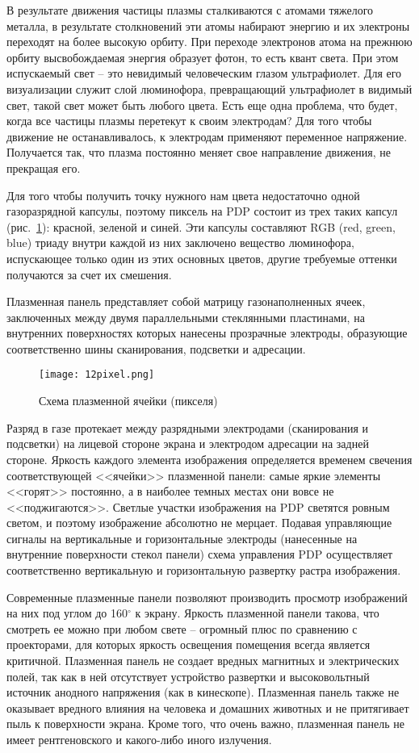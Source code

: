 В результате движения частицы плазмы сталкиваются с атомами тяжелого металла, в результате столкновений эти атомы набирают энергию и их электроны переходят на более высокую орбиту. При переходе электронов атома на прежнюю орбиту высвобождаемая энергия образует фотон, то есть квант света. При этом испускаемый свет – это невидимый человеческим глазом ультрафиолет. Для его визуализации служит слой люминофора, превращающий ультрафиолет в видимый свет, такой свет может быть любого цвета. Есть еще одна проблема, что будет, когда все частицы плазмы перетекут к своим электродам? Для того чтобы движение не останавливалось, к электродам применяют переменное напряжение. Получается так, что плазма постоянно меняет свое направление движения, не прекращая его. 

Для того чтобы получить точку нужного нам цвета недостаточно одной газоразрядной капсулы, поэтому пиксель на PDP состоит из трех таких капсул (рис.~\ref{pic:12pixel}): красной, зеленой и синей. Эти капсулы составляют RGB (red, green, blue) триаду внутри каждой из них заключено вещество люминофора, испускающее только один из этих основных цветов, другие требуемые оттенки получаются за счет их смешения. 

Плазменная панель представляет собой матрицу газонаполненных ячеек, заключенных между двумя параллельными стеклянными пластинами, на внутренних поверхностях которых нанесены прозрачные электроды, образующие соответственно шины сканирования, подсветки и адресации.

\begin{figure}[h!]
	\caption{ Схема плазменной ячейки (пикселя) }
	\texttt{[image: 12pixel.png]}
	\label{pic:12pixel}
\end{figure}

Разряд в газе протекает между разрядными электродами (сканирования и подсветки) на лицевой стороне экрана и электродом адресации на задней стороне. Яркость каждого элемента изображения определяется временем свечения соответствующей <<ячейки>> плазменной панели: самые яркие элементы <<горят>> постоянно, а в наиболее темных местах они вовсе не <<поджигаются>>. Светлые участки изображения на PDP светятся ровным светом, и поэтому изображение абсолютно не мерцает. Подавая управляющие сигналы на вертикальные и горизонтальные электроды (нанесенные на внутренние поверхности стекол панели) схема управления PDP осуществляет соответственно вертикальную и горизонтальную развертку растра изображения.

Современные плазменные панели позволяют производить просмотр изображений на них под углом до 160$ ^\circ $ к экрану. Яркость плазменной панели такова, что смотреть ее можно при любом свете – огромный плюс по сравнению с проекторами, для которых яркость освещения помещения всегда является критичной. Плазменная панель не создает вредных магнитных и электрических полей, так как в ней отсутствует устройство развертки и высоковольтный источник анодного напряжения (как в кинескопе). Плазменная панель также не оказывает вредного влияния на человека и домашних животных и не притягивает пыль к поверхности экрана. Кроме того, что очень важно, плазменная панель не имеет рентгеновского и какого-либо иного излучения. 

